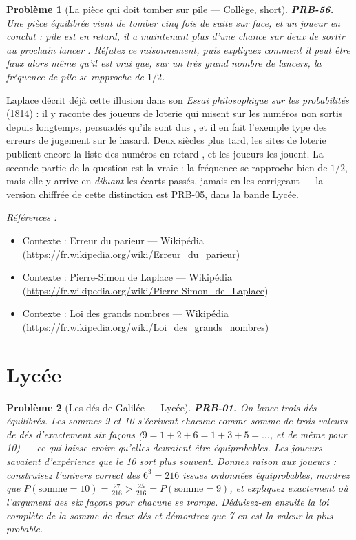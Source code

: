 \documentclass[11pt]{article}
\newtheorem{problem}{Problème}
\newenvironment{refs}{\par\small\noindent\emph{Références :}\begin{itemize}\setlength\itemsep{0pt}}{\end{itemize}\normalsize}
\begin{document}
\bigskip

\begin{problem}[{La pièce qui \og{} doit \fg{} tomber sur pile --- Collège, short}]
\textbf{PRB-56.} Une pièce équilibrée vient de tomber cinq fois de suite sur
face, et un joueur en conclut : \og{} pile est en retard, il a maintenant plus d'une chance sur deux de
sortir au prochain lancer \fg{}. Réfutez ce raisonnement, puis expliquez comment il peut être faux
alors même qu'il est vrai que, sur un très grand nombre de lancers, la fréquence de \og{} pile \fg{} se
rapproche de $ 1/2 $.
\end{problem}

\noindent Laplace décrit déjà cette illusion dans son \textit{Essai philosophique sur les
probabilités} (1814) : il y raconte des joueurs de loterie qui misent sur les numéros non sortis
depuis longtemps, persuadés qu'ils sont \og{} dus \fg{}, et il en fait l'exemple type des erreurs de
jugement sur le hasard. Deux siècles plus tard, les sites de loterie publient encore la liste des
numéros \og{} en retard \fg{}, et les joueurs les jouent. La seconde partie de la question est la vraie :
la fréquence se rapproche bien de $ 1/2 $, mais elle y arrive en \textit{diluant} les écarts
passés, jamais en les corrigeant --- la version chiffrée de cette distinction est PRB-05, dans la
bande Lycée.

\begin{refs}
\item Contexte : Erreur du parieur --- Wikipédia (\url{https://fr.wikipedia.org/wiki/Erreur_du_parieur})
\item Contexte : Pierre-Simon de Laplace --- Wikipédia (\url{https://fr.wikipedia.org/wiki/Pierre-Simon_de_Laplace})
\item Contexte : Loi des grands nombres --- Wikipédia (\url{https://fr.wikipedia.org/wiki/Loi_des_grands_nombres})
\end{refs}

\bigskip


\section*{Lycée}

\begin{problem}[{Les dés de Galilée --- Lycée}]
\textbf{PRB-01.} On lance trois dés équilibrés. Les sommes 9 et 10 s'écrivent
chacune comme somme de trois valeurs de dés d'exactement six façons
($ 9 = 1{+}2{+}6 = 1{+}3{+}5 = \dots $, et de même pour 10) --- ce qui laisse croire qu'elles
devraient être équiprobables. Les joueurs savaient d'expérience que le 10 sort plus souvent.
Donnez raison aux joueurs : construisez l'univers correct des $ 6^3 = 216 $ issues ordonnées
équiprobables, montrez que
$ P(\text{somme}=10) = \frac{27}{216} > \frac{25}{216} = P(\text{somme}=9) $, et expliquez
exactement où l'argument des \og{} six façons pour chacune \fg{} se trompe. Déduisez-en ensuite la loi
complète de la somme de \textit{deux} dés et démontrez que 7 en est la valeur la plus probable.
\end{problem}
\end{document}
